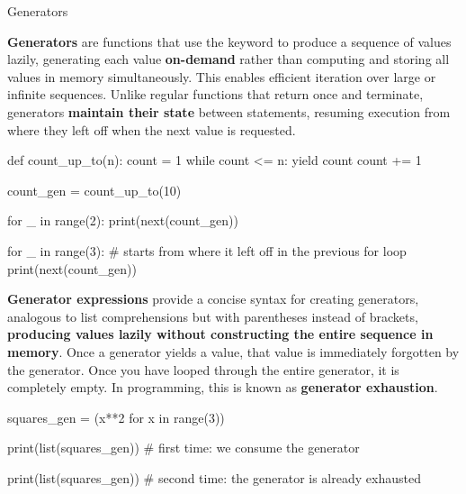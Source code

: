 \documentclass[10pt]{article}
\begin{document}
  \begin{core}{Generators}

    \textbf{Generators} are functions that use the  keyword to produce a sequence of values lazily, generating each value \textbf{on-demand} rather than computing and storing all values in memory simultaneously. This enables efficient iteration over large or infinite sequences. Unlike regular functions that return once and terminate, generators \textbf{maintain their state} between  statements, resuming execution from where they left off when the next value is requested.

    \begin{pyconsole}

      def count_up_to(n):
          count = 1
          while count <= n:
              yield count
              count += 1
     
      count_gen = count_up_to(10)

      for _ in range(2):
          print(next(count_gen))

      for _ in range(3): # starts from where it left off in the previous for loop
          print(next(count_gen))

    \end{pyconsole}
    
    \textbf{Generator expressions} provide a concise syntax for creating generators, analogous to list comprehensions but with parentheses instead of brackets, \textbf{producing values lazily without constructing the entire sequence in memory}. Once a generator yields a value, that value is immediately forgotten by the generator. Once you have looped through the entire generator, it is completely empty. In programming, this is known as \textbf{generator exhaustion}.

    \begin{pyconsole}

      squares_gen = (x**2 for x in range(3))

      print(list(squares_gen))  # first time: we consume the generator

      print(list(squares_gen))  # second time: the generator is already exhausted

    \end{pyconsole}

  \end{core}
\end{document}
